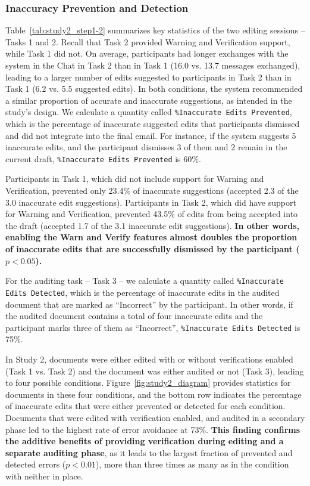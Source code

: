 \documentclass[manuscript]{acmart}
\begin{document}
\subsubsection{Inaccuracy Prevention and Detection} \label{sec:study2_evaluation_inaccuracy}



Table~\ref{tab:study2_step1-2} summarizes key statistics of the two editing sessions -- Tasks 1 and 2. Recall that Task 2 provided Warning and Verification support, while Task 1 did not. On average, participants had longer exchanges with the system in the Chat in Task 2 than in Task 1 (16.0 vs. 13.7 messages exchanged), leading to a larger number of edits suggested to participants in Task 2 than in Task 1 (6.2 vs. 5.5 suggested edits). In both conditions, the system recommended a similar proportion of accurate and inaccurate suggestions, as intended in the study's design.
We calculate a quantity called \texttt{\%Inaccurate Edits Prevented}, which is the percentage of inaccurate suggested edits that participants dismissed and did not integrate into the final email. For instance, if the system suggests 5 inaccurate edits, and the participant dismisses 3 of them and 2 remain in the current draft, \texttt{\%Inaccurate Edits Prevented} is 60\%.

Participants in Task 1, which did not include support for Warning and Verification, prevented only 23.4\% of inaccurate suggestions (accepted 2.3 of the 3.0 inaccurate edit suggestions). Participants in Task 2, which did have support for Warning and Verification, prevented 43.5\% of edits from being accepted into the draft (accepted 1.7 of the 3.1 inaccurate edit suggestions). \textbf{In other words, enabling the Warn and Verify features almost doubles the proportion of inaccurate edits that are successfully dismissed by the participant ($p<0.05$).}

For the auditing task -- Task 3 -- we calculate a quantity called \texttt{\%Inaccurate Edits Detected}, which is the percentage of inaccurate edits in the audited document that are marked as ``Incorrect'' by the participant. In other words, if the audited document contains a total of four inaccurate edits and the participant marks three of them as ``Incorrect'', \texttt{\%Inaccurate Edits Detected} is 75\%.

In Study 2, documents were either edited with or without verifications enabled (Task 1 vs. Task 2) and the document was either audited or not (Task 3), leading to four possible conditions. Figure~\ref{fig:study2_diagram} provides statistics for documents in these four conditions, and the bottom row indicates the percentage of inaccurate edits that were either prevented or detected for each condition. Documents that were edited with verification enabled, and audited in a secondary phase led to the highest rate of error avoidance at 73\%. \textbf{This finding confirms the additive benefits of providing verification during editing and a separate auditing phase}, as it leads to the largest fraction of prevented and detected errors ($p<0.01$), more than three times as many as in the condition with neither in place.
\end{document}
